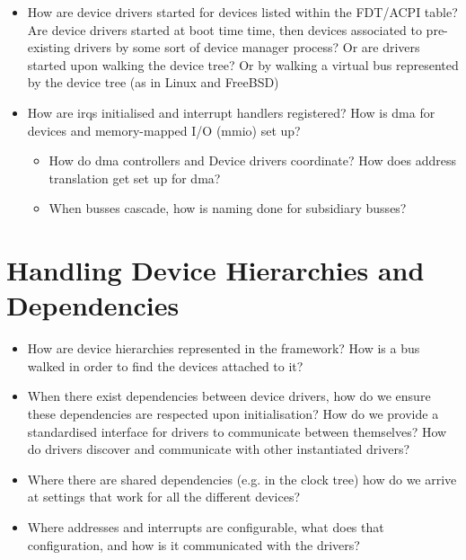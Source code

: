 \documentclass[a4paper,12pt]{report}
\begin{document}
\begin{itemize}
\item How are device drivers started for devices listed within the
  FDT/ACPI table? Are device drivers started at boot time time, then
  devices associated to pre-existing drivers by some sort of device
  manager process? Or are drivers started upon walking the device
  tree? Or by walking a virtual bus represented by the device tree (as
  in Linux and FreeBSD)
\item How are \glspl{irq} initialised and interrupt handlers registered? How
  is \gls{dma} for devices and memory-mapped I/O (\gls{mmio}) set up?
  \begin{itemize}
  \item How do \gls{dma} controllers and Device drivers coordinate?  How does
    address translation get set up for \gls{dma}?
  \item When busses cascade, how is naming done for subsidiary busses?
  \end{itemize}

\end{itemize}

\section{Handling Device Hierarchies and Dependencies}

\begin{itemize}
\item How are device hierarchies represented in the framework?  How is
  a bus walked in order to find the devices attached to it?
\item When there exist dependencies between device drivers, how do we
  ensure these dependencies are respected upon initialisation? How do
  we provide a standardised interface for drivers to communicate
  between themselves?  How do drivers discover and communicate with
  other instantiated drivers?
\item Where there are shared dependencies (e.g. in the clock tree)
  how do we arrive at settings that work for all the different
  devices?
\item Where addresses and interrupts are configurable, what does that
  configuration, and how is it communicated with the drivers?
\end{itemize}
\end{document}
